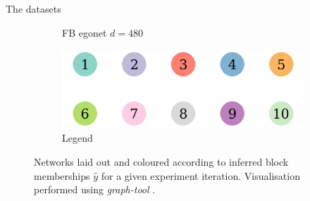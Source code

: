\documentclass{beamer}
\begin{document}
\begin{frame}{The datasets}
\begin{figure}[!h]
\begin{subfigure}[t]{0.3\linewidth}
				\caption{FB egonet $d=480$}
				\label{fig:fb-graph}
			\end{subfigure}
			\begin{subfigure}[t]{0.4\linewidth}
				\centering
				\includegraphics[width=0.8\linewidth]{10-horizontal-legend.png}
				\caption{Legend}
				\label{fig:10-legend}
			\end{subfigure}
			\caption{Networks laid out and coloured according to inferred block memberships $\hat{y}$ for a given experiment iteration. Visualisation performed using \textit{graph-tool} \cite{peixoto_graph-tool_2014}.}
			\label{fig:graphs-all}
		\end{figure}
	\end{frame}
	
\end{document}

